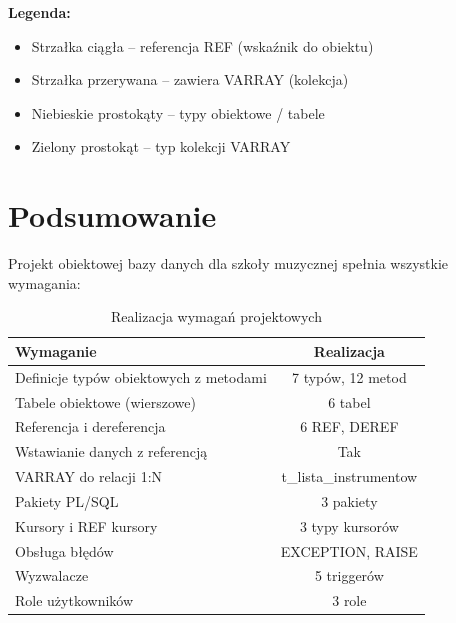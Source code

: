 \documentclass[12pt,a4paper]{article}
\begin{document}
\vspace{0.5cm}

\textbf{Legenda:}
\begin{itemize}[nosep]
    \item Strzałka ciągła -- referencja REF (wskaźnik do obiektu)
    \item Strzałka przerywana -- zawiera VARRAY (kolekcja)
    \item Niebieskie prostokąty -- typy obiektowe / tabele
    \item Zielony prostokąt -- typ kolekcji VARRAY
\end{itemize}

\section{Podsumowanie}

Projekt obiektowej bazy danych dla szkoły muzycznej spełnia wszystkie wymagania:

\begin{table}[h]
\centering
\begin{tabular}{|p{8cm}|c|}
\hline
\textbf{Wymaganie} & \textbf{Realizacja} \\
\hline
Definicje typów obiektowych z metodami & 7 typów, 12 metod \\
Tabele obiektowe (wierszowe) & 6 tabel \\
Referencja i dereferencja & 6 REF, DEREF \\
Wstawianie danych z referencją & Tak \\
VARRAY do relacji 1:N & t\_lista\_instrumentow \\
Pakiety PL/SQL & 3 pakiety \\
Kursory i REF kursory & 3 typy kursorów \\
Obsługa błędów & EXCEPTION, RAISE \\
Wyzwalacze & 5 triggerów \\
Role użytkowników & 3 role \\
\hline
\end{tabular}
\caption{Realizacja wymagań projektowych}
\end{table}
\end{document}
